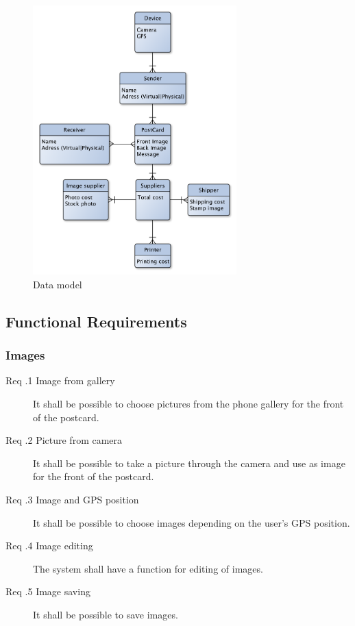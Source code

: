\documentclass[10pt,a4paper]{article}
\begin{document}
\begin{figure}[h!]
\centering
\includegraphics[width=0.7\textwidth]{DataModel.pdf}
\caption{Data model}
\label{fig:datamodel}
\end{figure}



\subsection{Functional Requirements}
\subsubsection{Images} 
\begin {description}
\item [Req \thesubsubsection .1 Image from gallery]It shall be possible to choose pictures from the phone gallery for the front of the postcard.
\item [Req \thesubsubsection .2 Picture from camera] It shall be possible to take a picture through the camera and use as image for the front of the postcard.
\item [Req \thesubsubsection .3 Image and GPS position] It shall be possible to choose images depending on the user's GPS position.
\item [Req \thesubsubsection .4 Image editing] The system shall have a function for editing of images.
\item [Req \thesubsubsection .5 Image saving] It shall be possible to save images.
\end{description}
\end{document}
